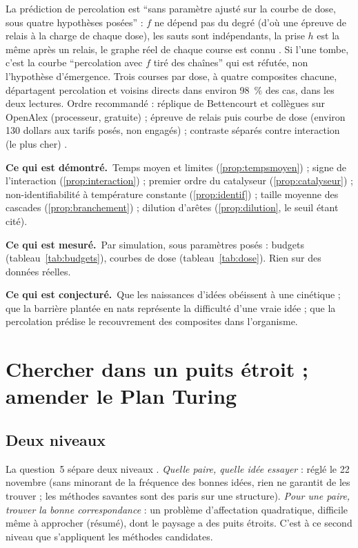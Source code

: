 \documentclass[11pt,a4paper]{article}
\theoremstyle{definition}
\theoremstyle{plain}
\newcommand{\demontre}{\par\noindent\textbf{Ce qui est démontré.}~}
\newcommand{\mesure}{\par\smallskip\noindent\textbf{Ce qui est mesuré.}~}
\newcommand{\conjecture}{\par\smallskip\noindent\textbf{Ce qui est conjecturé.}~}
\begin{document}
La prédiction de percolation est \enquote{sans paramètre ajusté sur la courbe de dose, sous quatre
hypothèses posées} : $f$ ne dépend pas du degré (d'où une épreuve de relais à la charge de chaque
dose), les sauts sont indépendants, la prise $h$ est la même après un relais, le graphe réel de
chaque course est connu \cite{erratumq4}. Si l'une tombe, c'est la courbe \enquote{percolation avec
$f$ tiré des chaînes} qui est réfutée, non l'hypothèse d'émergence. Trois courses par dose, à quatre
composites chacune, départagent percolation et voisins directs dans environ 98~\% des cas, dans les
deux lectures. Ordre recommandé : réplique de Bettencourt et collègues sur OpenAlex (processeur,
gratuite) ; épreuve de relais puis courbe de dose (environ 130 dollars aux tarifs posés, non
engagés) ; contraste séparés contre interaction (le plus cher) \cite[section~6]{q4}.

\begin{statuts}
\demontre Temps moyen et limites (\ref{prop:tempsmoyen}) ; signe de l'interaction
(\ref{prop:interaction}) ; premier ordre du catalyseur (\ref{prop:catalyseur}) ; non-identifiabilité
à température constante (\ref{prop:identif}) ; taille moyenne des cascades (\ref{prop:branchement}) ;
dilution d'arêtes (\ref{prop:dilution}, le seuil étant cité).
\mesure Par simulation, sous paramètres posés : budgets (tableau~\ref{tab:budgets}), courbes de dose
(tableau~\ref{tab:dose}). Rien sur des données réelles.
\conjecture Que les naissances d'idées obéissent à une cinétique ; que la barrière plantée en nats
représente la difficulté d'une vraie idée ; que la percolation prédise le recouvrement des
composites dans l'organisme.
\end{statuts}

\section{Chercher dans un puits étroit ; amender le Plan Turing}
\label{sec:recherche}

\subsection{Deux niveaux}
La question~5 sépare deux niveaux \cite[section~7]{q5}. \emph{Quelle paire, quelle idée essayer} :
réglé le 22 novembre (sans minorant de la fréquence des bonnes idées, rien ne garantit de les
trouver ; les méthodes savantes sont des paris sur une structure). \emph{Pour une paire, trouver la
bonne correspondance} : un problème d'affectation quadratique, difficile même à approcher
\cite{sahni1976} (résumé), dont le paysage a des puits étroits. C'est à ce second niveau que
s'appliquent les méthodes candidates.
\end{document}
